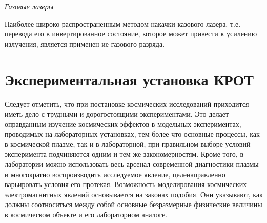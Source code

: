 \textit{Газовые лазеры}

Наиболее широко распространенным методом накачки казового лазера, т.е. перевода его в инвертированное состояние, которое может привести к усилению излучения, является применен
ие газового разряда.




\section{Экспериментальная установка КРОТ} %


Следует отметить, что при постановке космических исследований приходится иметь дело с трудными и дорогостоящими экспериментами. Это делает оправданным изучение космических эффектов в модельных экспериментах, проводимых на лабораторных установках, тем более что основные процессы, как в космической плазме, так и в лабораторной, при правильном выборе условий эксперимента подчиняются одним и тем же закономерностям. Кроме того, в лаборатории можно использовать весь арсенал современной диагностики плазмы и многократно воспроизводить исследуемое явление, целенаправленно варьировать условия его протекая. Возможность моделирования космических электромагнитных явлений основывается на законах подобия. Они указывают, как должны соотноситься между собой основные безразмерные физические величины в космическом объекте и его лабораторном аналоге. 



